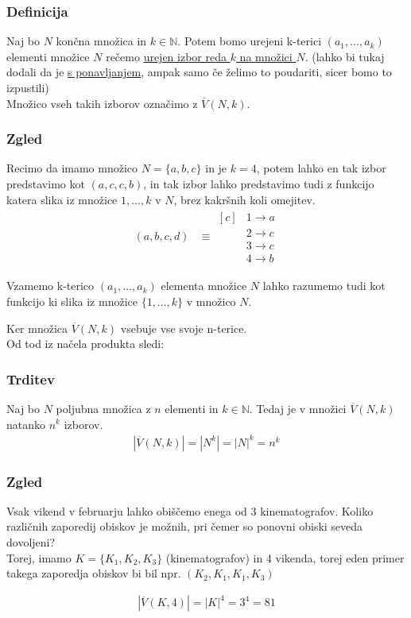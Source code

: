 \subsubsection{Definicija}
Naj bo $N$ končna množica in $k \in \mathbb{N}$. Potem bomo urejeni k-terici $(a_1, \dots, a_k)$ elementi množice $N$ rečemo \underline{urejen izbor reda $k$ na množici $N$}. (lahko bi tukaj dodali da je \underline{s ponavljanjem}, ampak samo če želimo to poudariti, sicer bomo to izpustili) \\[1em]
Množico vseh takih izborov označimo z $\overline{V}(N, k)$.

\subsubsection{Zgled}
Recimo da imamo množico $N = \{a, b, c\}$ in je $k = 4$, potem lahko en tak izbor predstavimo kot $(a, c, c, b)$, in tak izbor lahko predstavimo tudi z funkcijo katera slika iz množice $1, \dots, k$ v $N$, brez kakršnih koli omejitev.
\begin{align*}
    (a, b, c, d) &\equiv
    \boxed{
        \begin{aligned}[c]
            &1 \to a \\
            &2 \to c \\
            &3 \to c \\
            &4 \to b
        \end{aligned}
    }
\end{align*}

\begin{opomba}
    Vzamemo k-terico $(a_1, \dots, a_k)$ elementa množice $N$ lahko razumemo tudi kot funkcijo ki slika iz množice $\{1, \dots, k\}$ v množico $N$.
\end{opomba}

\noindent
Ker množica $\overline{V}(N, k)$ vsebuje vse svoje n-terice. \\

\noindent
Od tod iz načela produkta sledi:

\subsubsection{Trditev}
Naj bo $N$ poljubna množica z $n$ elementi in $k \in \mathbb{N}$. Tedaj je v množici $\overline{V}(N, k)$ natanko $n^k$ izborov.
\begin{align*}
    |\overline{V}(N, k)| = |N^k| = |N|^k = n^k
\end{align*}

\subsubsection{Zgled}
Vsak vikend v februarju lahko obiščemo enega od 3 kinematografov. Koliko različnih zaporedij obiskov je možnih, pri čemer so ponovni obiski seveda dovoljeni? \\[1em]
Torej, imamo $K = \{K_1, K_2, K_3\}$ (kinematografov) in 4 vikenda, torej eden primer takega zaporedja obiskov bi bil npr. $(K_2, K_1, K_1, K_3)$

\begin{align*}
    |\overline{V}(K, 4)| = |K|^4 = 3^4 = 81
\end{align*}